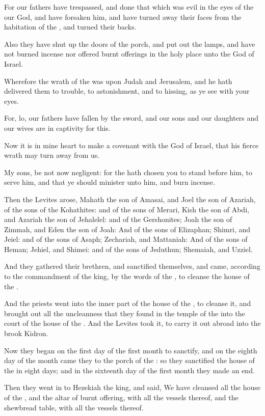 \verse For our fathers have trespassed, and done that which was evil in the eyes of the \LORD our God, and have forsaken him, and have turned away their faces from the habitation of the \LORD, and turned their backs.

\verse Also they have shut up the doors of the porch, and put out the lamps, and have not burned incense nor offered burnt offerings in the holy place unto the God of Israel.

\verse Wherefore the wrath of the \LORD was upon Judah and Jerusalem, and he hath delivered them to trouble, to astonishment, and to hissing, as ye see with your eyes.

\verse For, lo, our fathers have fallen by the sword, and our sons and our daughters and our wives are in captivity for this.

\verse Now it is in mine heart to make a covenant with the \LORD God of Israel, that his fierce wrath may turn away from us.

\verse My sons, be not now negligent: for the \LORD hath chosen you to stand before him, to serve him, and that ye should minister unto him, and burn incense.

\verse Then the Levites arose, Mahath the son of Amasai, and Joel the son of Azariah, of the sons of the Kohathites: and of the sons of Merari, Kish the son of Abdi, and Azariah the son of Jehalelel: and of the Gershonites; Joah the son of Zimmah, and Eden the son of Joah: \verse And of the sons of Elizaphan; Shimri, and Jeiel: and of the sons of Asaph; Zechariah, and Mattaniah: \verse And of the sons of Heman; Jehiel, and Shimei: and of the sons of Jeduthun; Shemaiah, and Uzziel.

\verse And they gathered their brethren, and sanctified themselves, and came, according to the commandment of the king, by the words of the \LORD, to cleanse the house of the \LORD.

\verse And the priests went into the inner part of the house of the \LORD, to cleanse it, and brought out all the uncleanness that they found in the temple of the \LORD into the court of the house of the \LORD. And the Levites took it, to carry it out abroad into the brook Kidron.

\verse Now they began on the first day of the first month to sanctify, and on the eighth day of the month came they to the porch of the \LORD: so they sanctified the house of the \LORD in eight days; and in the sixteenth day of the first month they made an end.

\verse Then they went in to Hezekiah the king, and said, We have cleansed all the house of the \LORD, and the altar of burnt offering, with all the vessels thereof, and the shewbread table, with all the vessels thereof.

